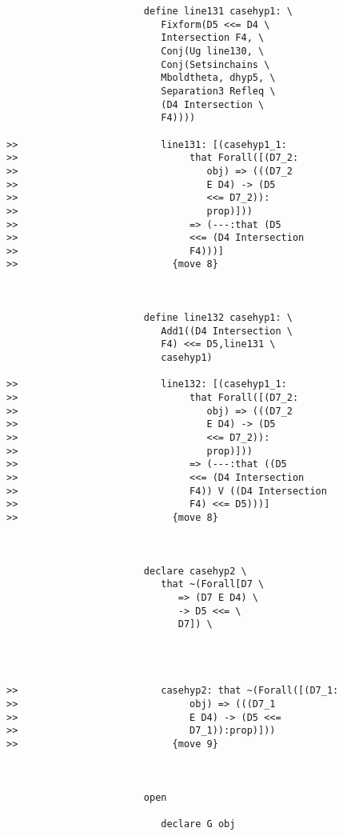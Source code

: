 \documentclass[12pt]{article}
\begin{document}
\begin{verbatim}
                        define line131 casehyp1: \
                           Fixform(D5 <<= D4 \
                           Intersection F4, \
                           Conj(Ug line130, \
                           Conj(Setsinchains \
                           Mboldtheta, dhyp5, \
                           Separation3 Refleq \
                           (D4 Intersection \
                           F4))))

>>                         line131: [(casehyp1_1:
>>                              that Forall([(D7_2:
>>                                 obj) => (((D7_2
>>                                 E D4) -> (D5
>>                                 <<= D7_2)):
>>                                 prop)]))
>>                              => (---:that (D5
>>                              <<= (D4 Intersection
>>                              F4)))]
>>                           {move 8}



                        define line132 casehyp1: \
                           Add1((D4 Intersection \
                           F4) <<= D5,line131 \
                           casehyp1)

>>                         line132: [(casehyp1_1:
>>                              that Forall([(D7_2:
>>                                 obj) => (((D7_2
>>                                 E D4) -> (D5
>>                                 <<= D7_2)):
>>                                 prop)]))
>>                              => (---:that ((D5
>>                              <<= (D4 Intersection
>>                              F4)) V ((D4 Intersection
>>                              F4) <<= D5)))]
>>                           {move 8}



                        declare casehyp2 \
                           that ~(Forall[D7 \
                              => (D7 E D4) \
                              -> D5 <<= \
                              D7]) \
                           



>>                         casehyp2: that ~(Forall([(D7_1:
>>                              obj) => (((D7_1
>>                              E D4) -> (D5 <<=
>>                              D7_1)):prop)]))
>>                           {move 9}



                        open

                           declare G obj



\end{verbatim}
\end{document}
